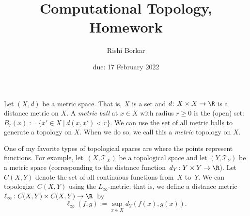 \documentclass{article}
\title{Computational Topology, Homework \hwnum}
\author{Rishi Borkar}
\date{due: 17 February 2022}
\begin{document}
\maketitle



Let $(X,d)$ be a metric space.  That is, $X$ is a set and $d \colon X \times X
\to \R$ is a distance metric on $X$.  A \emph{metric ball} at $x \in X$ with
radius $r \geq 0$ is the (open) set: $B_r(x) := \{x' \in X ~|~ d(x,x') < r \}$.
We can use the set of all metric balls to generate a
topology on $X$.  When we do so, we call this a \emph{metric} topology on $X$.

One of my favorite types of topological spaces are where the points represent
functions.  For example, let~$(X,\mathcal{T}_X)$ be a topological space
and let $(Y,\mathcal{T}_Y)$ be
a metric space (corresponding to the distance function~$d_Y
\colon Y \times Y \to \R$).  Let $C(X,Y)$ denote the set of all continuous
functions from~$X$ to~$Y$.  We can topologize~$C(X,Y)$ using the $L_{\infty}$-metric; that is,
we define a distance metric $\ell_{\infty} \colon C(X,Y) \times C(X,Y) \to
\R$~by
$$\ell_{\infty}(f,g) := \sup_{x \in X} d_Y(f(x),g(x)).$$
\end{document}
